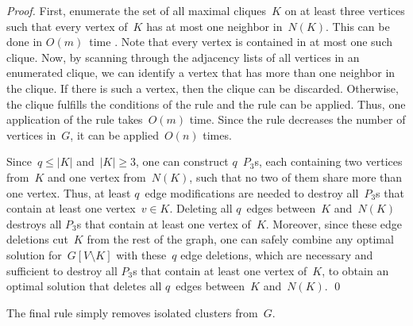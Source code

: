 \documentclass[envcountsame,numbook,smallextended]{svjour3}
\numberwithin{equation}{section}
\numberwithin{figure}{section}
\begin{document}
\begin{proof}
  First, enumerate the set of all maximal cliques~$K$
  on at least three vertices
  such that every vertex of~$K$
  has at most one neighbor in~$N(K)$.
  This can be done in $O(m)$~time \cite{KHMN09}.
  Note that every vertex is contained
  in at most one such clique.
  Now, by scanning
  through the adjacency lists of all vertices
  in an enumerated clique,
  we can identify a vertex that has
  more than one neighbor in the clique. If there is such a vertex, then the clique can be discarded.
  Otherwise, the clique fulfills the conditions
  of the rule and the rule can be applied.
  Thus, one application of the rule takes~$O(m)$ time.
  Since the rule decreases the number of vertices in~$G$,
  it can be applied~$O(n)$ times.

  Since~$q\le |K|$ and~$|K|\ge 3$,
  one can construct $q$~$P_3$s,
  each containing two vertices from~$K$
  and one vertex from~$N(K)$,
  such that no two of them share more than one vertex.
  Thus, at least $q$~edge modifications are needed
  to destroy all~$P_3$s
  that contain at least one vertex~$v\in K$.
  Deleting all $q$~edges between~$K$ and~$N(K)$
  destroys all $P_3$s that
  contain at least one vertex of~$K$.
  Moreover, since these edge deletions cut~$K$
  from the rest of the graph,
  one can safely combine
  any optimal solution for~$G[V\setminus K]$
  with these~$q$ edge deletions,
  which are necessary and sufficient
  to destroy all $P_3$s that contain
  at least one vertex of~$K$,
  to obtain an optimal solution
  that deletes all $q$~edges between~$K$ and~$N(K)$.
\qed\end{proof}
The final rule simply removes isolated clusters from~$G$. 
\end{document}
